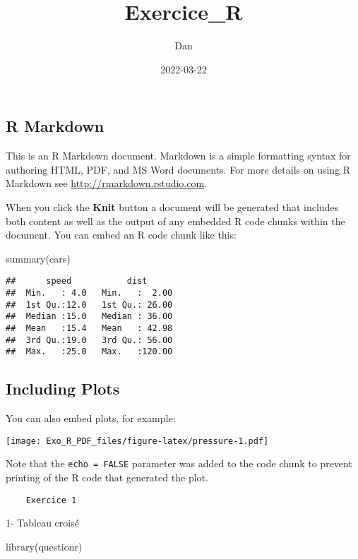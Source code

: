 \documentclass[
]{article}
\title{Exercice\_R}
\author{Dan}
\date{2022-03-22}
\newenvironment{Shaded}{\begin{snugshade}}{\end{snugshade}}
\newcommand{\FunctionTok}[1]{\textcolor[rgb]{0.00,0.00,0.00}{#1}}
\newcommand{\NormalTok}[1]{#1}
\begin{document}
\maketitle

\hypertarget{r-markdown}{%
\subsection{R Markdown}\label{r-markdown}}

This is an R Markdown document. Markdown is a simple formatting syntax
for authoring HTML, PDF, and MS Word documents. For more details on
using R Markdown see \url{http://rmarkdown.rstudio.com}.

When you click the \textbf{Knit} button a document will be generated
that includes both content as well as the output of any embedded R code
chunks within the document. You can embed an R code chunk like this:

\begin{Shaded}
\begin{Highlighting}[]
\FunctionTok{summary}\NormalTok{(cars)}
\end{Highlighting}
\end{Shaded}

\begin{verbatim}
##      speed           dist       
##  Min.   : 4.0   Min.   :  2.00  
##  1st Qu.:12.0   1st Qu.: 26.00  
##  Median :15.0   Median : 36.00  
##  Mean   :15.4   Mean   : 42.98  
##  3rd Qu.:19.0   3rd Qu.: 56.00  
##  Max.   :25.0   Max.   :120.00
\end{verbatim}

\hypertarget{including-plots}{%
\subsection{Including Plots}\label{including-plots}}

You can also embed plots, for example:

\texttt{[image: Exo\_R\_PDF\_files/figure-latex/pressure-1.pdf]}

Note that the \texttt{echo\ =\ FALSE} parameter was added to the code
chunk to prevent printing of the R code that generated the plot.

\begin{verbatim}
    Exercice 1
\end{verbatim}

1- Tableau croisé

\begin{Shaded}
\begin{Highlighting}[]
\FunctionTok{library}\NormalTok{(questionr)}
\end{Highlighting}
\end{Shaded}
\end{document}
